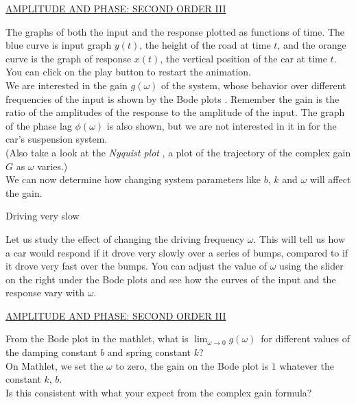 \href{http://mathlets.org/mathlets/amplitude-and-phase-2nd-order-iii/}
{AMPLITUDE AND PHASE: SECOND ORDER III}


The graphs of both the input and the response plotted as functions of time.
The blue curve is input graph $y(t)$, the height of the road at time $t$,
and the orange curve is the graph of response $x(t)$,
the vertical position of the car at time $t$.
You can click on the play button to restart the animation. \\

We are interested in the gain $g(\omega)$ of the system,
whose behavior over different frequencies of the input is shown by the Bode plots .
Remember the gain is the ratio of the amplitudes of the response to the amplitude of the input.
The graph of the phase lag $\phi (\omega)$ is also shown, but we are not interested in it in for the car's suspension system.\\

(Also take a look at the \emph{\color{blue}Nyquist plot} , a plot of the trajectory of the complex gain $G$ as $\omega$ varies.)\\

We can now determine how changing system parameters like $b,\, k$ and $\omega$ will affect the gain.

\begin{problem}
  Driving very slow
\end{problem}

Let us study the effect of changing the driving frequency $\omega$.
This will tell us how a car would respond if it drove very slowly over a series of bumps,
compared to if it drove very fast over the bumps.
You can adjust the value of $\omega$ using the slider on the right under the Bode plots
and see how the curves of the input and the response vary with $\omega$.

\href{http://mathlets.org/mathlets/amplitude-and-phase-2nd-order-iii/}
{AMPLITUDE AND PHASE: SECOND ORDER III}

From the Bode plot in the mathlet, what is $\displaystyle \lim _{\omega \to 0} g(\omega )\,$
for different values of the damping constant $b$ and spring constant $k$?\\

On Mathlet, we set the $\omega$ to zero, the gain on the Bode plot is $1$
whatever the constant $k,\, b$. \\

Is this consistent with what your expect from the complex gain formula?

